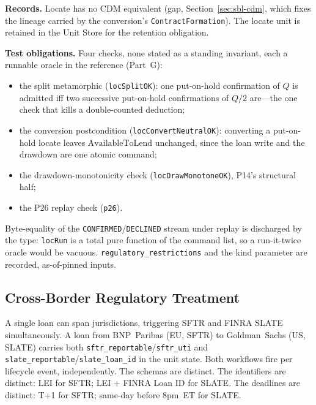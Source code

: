 \noindent\textbf{Records.} Locate has no CDM equivalent (gap, Section~\ref{sec:sbl-cdm}, which fixes the lineage carried by the conversion's \texttt{ContractFormation}). The locate unit is retained in the Unit Store for the retention obligation.

\noindent\textbf{Test obligations.} Four checks, none stated as a standing invariant, each a runnable oracle in the reference (Part~G):
\begin{itemize}[nosep]
\item the split metamorphic (\texttt{locSplitOK}): one put-on-hold confirmation of $Q$ is admitted iff two successive put-on-hold confirmations of $Q/2$ are---the one check that kills a double-counted deduction;
\item the conversion postcondition (\texttt{locConvertNeutralOK}): converting a put-on-hold locate leaves $\text{AvailableToLend}$ unchanged, since the loan write and the drawdown are one atomic command;
\item the drawdown-monotonicity check (\texttt{locDrawMonotoneOK}), P14's structural half;
\item the P26 replay check (\texttt{p26}).
\end{itemize}
Byte-equality of the \texttt{CONFIRMED}/\texttt{DECLINED} stream under replay is discharged by the type: \texttt{locRun} is a total pure function of the command list, so a run-it-twice oracle would be vacuous. \texttt{regulatory\_restrictions} and the kind parameter are recorded, as-of-pinned inputs.

\subsection{Cross-Border Regulatory Treatment}
\label{sec:sbl-crossborder}

A single loan can span jurisdictions, triggering SFTR and FINRA SLATE simultaneously. A loan from BNP~Paribas (EU, SFTR) to Goldman~Sachs (US, SLATE) carries both \texttt{sftr\_reportable}\slash\allowbreak\texttt{sftr\_uti} and\allowbreak{} \texttt{slate\_reportable}\slash\allowbreak\texttt{slate\_loan\_id} in the unit state. Both workflows fire per lifecycle event, independently. The schemas are distinct. The identifiers are distinct: LEI for SFTR; LEI + FINRA Loan ID for SLATE. The deadlines are distinct: T+1 for SFTR; same-day before 8pm~ET for SLATE.

